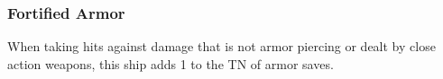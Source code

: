 \subsubsection{Fortified Armor}
When taking hits against damage that is not armor piercing or dealt by close action weapons, this ship adds 1 to the TN of armor saves. 